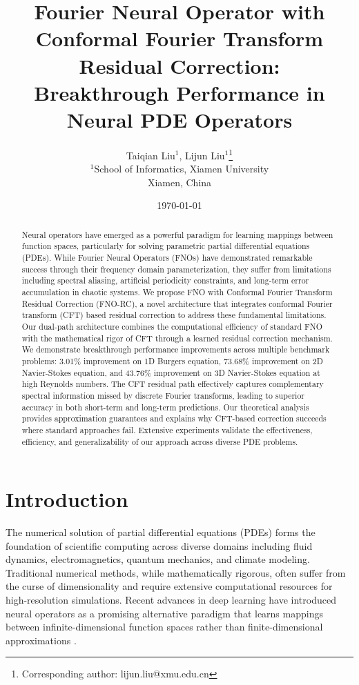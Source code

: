 \documentclass[11pt,twocolumn]{article}
\title{Fourier Neural Operator with Conformal Fourier Transform Residual Correction: \\ Breakthrough Performance in Neural PDE Operators}
\author{
    Taiqian Liu$^{1}$, Lijun Liu$^{1}$\thanks{Corresponding author: lijun.liu@xmu.edu.cn} \\
    $^{1}$School of Informatics, Xiamen University \\
    Xiamen, China
}
\date{\today}
\begin{document}
\maketitle

\begin{abstract}
Neural operators have emerged as a powerful paradigm for learning mappings between function spaces, particularly for solving parametric partial differential equations (PDEs). While Fourier Neural Operators (FNOs) have demonstrated remarkable success through their frequency domain parameterization, they suffer from limitations including spectral aliasing, artificial periodicity constraints, and long-term error accumulation in chaotic systems. We propose FNO with Conformal Fourier Transform Residual Correction (FNO-RC), a novel architecture that integrates conformal Fourier transform (CFT) based residual correction to address these fundamental limitations. Our dual-path architecture combines the computational efficiency of standard FNO with the mathematical rigor of CFT through a learned residual correction mechanism. We demonstrate breakthrough performance improvements across multiple benchmark problems: 3.01\% improvement on 1D Burgers equation, 73.68\% improvement on 2D Navier-Stokes equation, and 43.76\% improvement on 3D Navier-Stokes equation at high Reynolds numbers. The CFT residual path effectively captures complementary spectral information missed by discrete Fourier transforms, leading to superior accuracy in both short-term and long-term predictions. Our theoretical analysis provides approximation guarantees and explains why CFT-based correction succeeds where standard approaches fail. Extensive experiments validate the effectiveness, efficiency, and generalizability of our approach across diverse PDE problems.
\end{abstract}

\section{Introduction}

The numerical solution of partial differential equations (PDEs) forms the foundation of scientific computing across diverse domains including fluid dynamics, electromagnetics, quantum mechanics, and climate modeling. Traditional numerical methods, while mathematically rigorous, often suffer from the curse of dimensionality and require extensive computational resources for high-resolution simulations. Recent advances in deep learning have introduced neural operators as a promising alternative paradigm that learns mappings between infinite-dimensional function spaces rather than finite-dimensional approximations \citep{chen2018neural,lu2021learning}.
\end{document}
